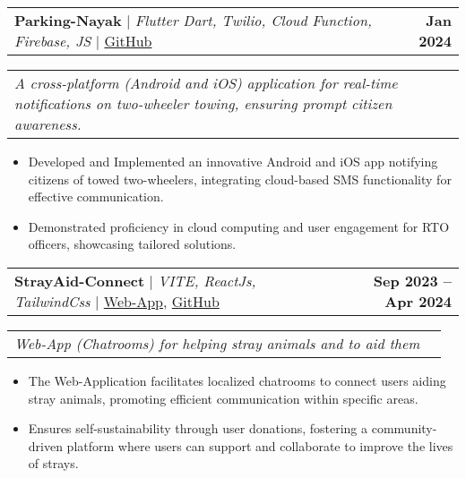 \documentclass[letterpaper,11pt]{article}
\makeatletter
\newcommand{\resumeItem}[1]{
  \item\small{
    {#1 \vspace{-1pt}}
  }
}
\newcommand{\resumeSubSubheading}[2]{
    \item
    \begin{tabular*}{0.97\textwidth}{l@{\extracolsep{\fill}}r}
      \textit{\small#1} & \textit{\small #2} \\
    \end{tabular*}\vspace{-7pt}
}
\newcommand{\resumeProjectHeading}[2]{
    \item
    \begin{tabular*}{1.001\textwidth}{l@{\extracolsep{\fill}}r}
      \small#1 & \textbf{\small #2}\\
    \end{tabular*}\vspace{-7pt}
}
\newcommand{\resumeItemListStart}{\begin{itemize}}
\newcommand{\resumeItemListEnd}{\end{itemize}\vspace{-5pt}}
\makeatother
\begin{document}
    \vspace{-15pt}

    \resumeProjectHeading
        {\textbf{\normalsize{Parking-Nayak}} $|$ \emph{Flutter Dart, Twilio, Cloud Function, Firebase, JS} $|$ \href{https://github.com/KaustubhPatil02/ParkingNayak-FlutterApp}{GitHub}}{Jan 2024}
        \resumeSubSubheading{A cross-platform (Android and iOS) application for real-time notifications on two-wheeler towing, ensuring prompt citizen awareness.}{}
        \resumeItemListStart
            \resumeItem{Developed and Implemented an innovative Android and iOS app notifying citizens of towed two-wheelers, integrating cloud-based SMS functionality for effective communication.}
            \resumeItem{Demonstrated proficiency in cloud computing and user engagement for RTO officers, showcasing tailored solutions.}
        \resumeItemListEnd

    \vspace{-15pt}

    \resumeProjectHeading
        {\textbf{\normalsize{StrayAid-Connect}} $|$ \emph{VITE, ReactJs, TailwindCss} $|$ \href{https://stray-aid-connect.vercel.app/}{Web-App}, \href{https://github.com/kxpatil02/strayAid-connect}{GitHub}}{Sep 2023 -- Apr 2024}
        \resumeSubSubheading{Web-App (Chatrooms) for helping stray animals and to aid them}{}
        \resumeItemListStart
            \resumeItem{The Web-Application facilitates localized chatrooms to connect users aiding stray animals, promoting efficient communication within specific areas.}
            \resumeItem{Ensures self-sustainability through user donations, fostering a community-driven platform where users can support and collaborate to improve the lives of strays.}
        \resumeItemListEnd

    

    \vspace{-9pt}


\end{document}
